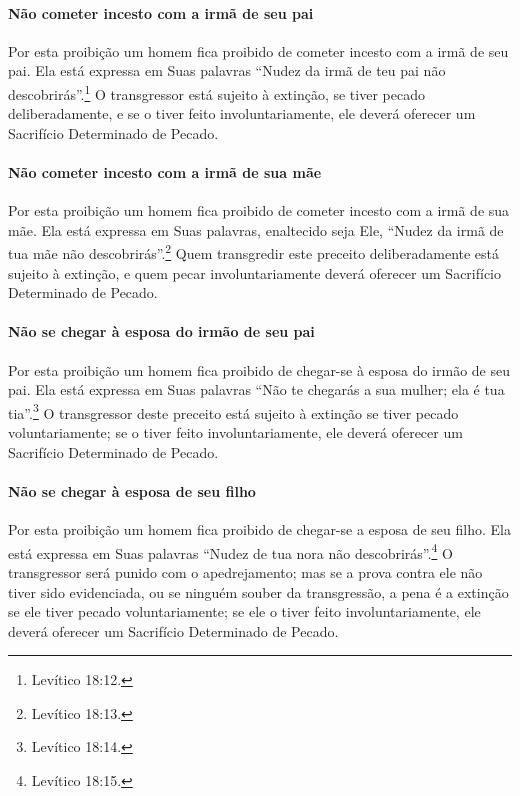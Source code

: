 \paragraph{Não cometer incesto com a irmã de seu pai}

Por esta proibição um homem fica proibido de cometer incesto com a irmã
de seu pai. Ela está expressa em Suas palavras ``Nudez da irmã de teu
pai não descobrirás''.\footnote{Levítico 18:12.} O transgressor está sujeito à
extinção, se tiver pecado deliberadamente, e se o tiver feito
involuntariamente, ele deverá oferecer um Sacrifício Determinado de
Pecado.

\paragraph{Não cometer incesto com a irmã de sua mãe}

Por esta proibição um homem fica proibido de cometer incesto com a irmã
de sua mãe. Ela está expressa em Suas palavras, enaltecido seja Ele,
``Nudez da irmã de tua mãe não descobrirás''.\footnote{Levítico 18:13.} Quem
transgredir este preceito deliberadamente está sujeito à extinção, e
quem pecar involuntariamente deverá oferecer um Sacrifício Determinado
de Pecado.

\paragraph{Não se chegar à esposa do irmão de seu pai}

Por esta proibição um homem fica proibido de chegar-se à esposa do irmão
de seu pai. Ela está expressa em Suas palavras ``Não te chegarás a sua
mulher; ela é tua tia''.\footnote{Levítico 18:14.} O transgressor deste preceito
está sujeito à extinção se tiver pecado voluntariamente; se o tiver
feito involuntariamente, ele deverá oferecer um Sacrifício Determinado
de Pecado.

\paragraph{Não se chegar à esposa de seu filho}

Por esta proibição um homem fica proibido de chegar-se a esposa de seu
filho. Ela está expressa em Suas palavras ``Nudez de tua nora não
descobrirás''.\footnote{Levítico 18:15.} O transgressor será punido com o
apedrejamento; mas se a prova contra ele não tiver sido evidenciada, ou
se ninguém souber da transgressão, a pena é a extinção se ele tiver
pecado voluntariamente; se ele o tiver feito involuntariamente, ele
deverá oferecer um Sacrifício Determinado de Pecado.

